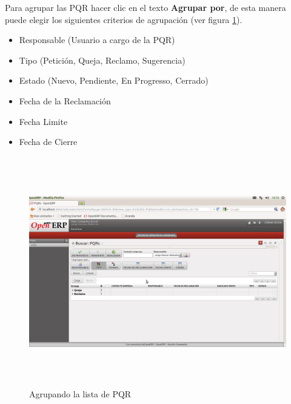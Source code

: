 Para agrupar las PQR hacer clic en el texto \textbf{Agrupar por}, de esta manera puede elegir los siguientes
criterios de agrupación (ver figura \ref{fig:menulistagroup}).
\begin{itemize}
 \item Responsable (Usuario a cargo de la PQR)
 \item Tipo (Petición, Queja, Reclamo, Sugerencia)
 \item Estado (Nuevo, Pendiente, En Progresso, Cerrado)
 \item Fecha de la Reclamación
 \item Fecha Limite
 \item Fecha de Cierre
\end{itemize}
\begin{figure}[H]
 \centering
 \includegraphics[width=17cm,height=10cm]{./Imagenes/menulistagroup.png}
 \caption{Agrupando la lista de PQR}
 \label{fig:menulistagroup}
\end{figure}

